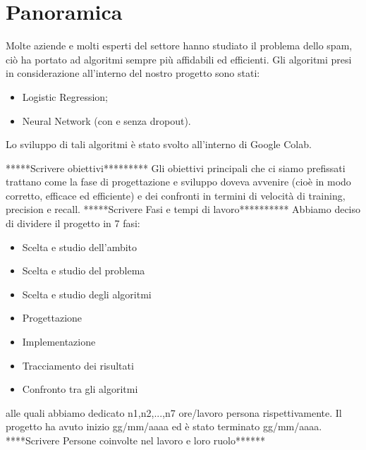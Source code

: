 \newpage
\section{Panoramica}
Molte aziende e molti esperti del settore hanno studiato il problema dello spam, ciò ha portato ad algoritmi sempre più affidabili ed efficienti.
Gli algoritmi presi in considerazione all'interno del nostro progetto sono stati:
\begin{itemize}
	\item Logistic Regression;
	\item Neural Network (con e senza dropout).
\end{itemize}
Lo sviluppo di tali algoritmi è stato svolto all'interno di Google Colab. 

*****Scrivere obiettivi*********
Gli obiettivi principali che ci siamo prefissati trattano come la fase di progettazione e sviluppo doveva avvenire (cioè in modo corretto, efficace ed efficiente) e dei confronti in termini di velocità di training, precision e recall.
*****Scrivere Fasi e tempi di lavoro**********
Abbiamo deciso di dividere il progetto in 7 fasi:
\begin{itemize}
	\item{Scelta e studio dell'ambito}
	\item{Scelta e studio del problema}
	\item{Scelta e studio degli algoritmi}
	\item{Progettazione}
	\item{Implementazione}
	\item{Tracciamento dei risultati}
	\item{Confronto tra gli algoritmi}
\end{itemize}
alle quali abbiamo dedicato n1,n2,...,n7 ore/lavoro persona rispettivamente.
Il progetto ha avuto inizio gg/mm/aaaa ed è stato terminato gg/mm/aaaa.
****Scrivere Persone coinvolte nel lavoro e loro ruolo******

\newpage